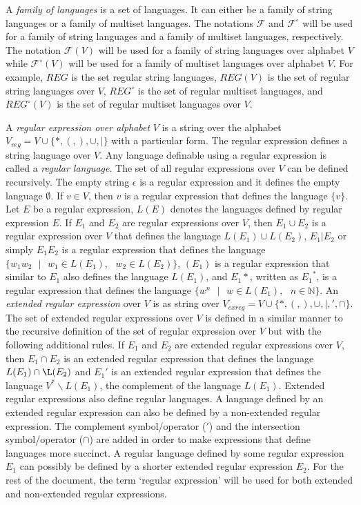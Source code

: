 \documentclass[a4paper]{article}
\theoremstyle{definition}
\newcommand{\ts}{\text{ }}
\begin{document}
A \emph{family of languages} is a set of languages. It can either be a family of string languages or 
a family of multiset languages. The notations $\mathscr{F}$ and $\mathscr{F}^{\circ}$ will be used
for a family of string languages and a family of multiset languages, respectively. The notation
$\mathscr{F}(V)$ will be used for a family of string languages over alphabet $V$ while 
$\mathscr{F}^{\circ}(V)$ will be used for a family of multiset languages over alphabet $V$. For
example, $REG$ is the set regular string languages, $REG(V)$ is the set of regular string 
languages over $V$, $REG^{\circ}$ is the set of regular multiset languages, and $REG^{\circ}(V)$ 
is the set of regular multiset languages over $V$.

A \emph{regular expression over alphabet} $V$ is a string over the alphabet $V_{reg} = V \cup 
\{*,(,),\cup,|\}$ with a particular form. The regular expression defines a string language over $V$.
Any language definable using a regular expression is called a \emph{regular language}. The set of 
all regular expressions over $V$ can be defined recursively. The empty string $\epsilon$ is a 
regular expression and it defines the empty language $\emptyset$. If $v \in V$, then $v$ is a
regular expression that defines the language $\{v\}$. Let $E$ be a regular expression, $L(E)$ 
denotes the languages defined by regular expression $E$. If $E_1$ and $E_2$ are regular expressions
over $V$, then $E_1 \cup E_2$ is a regular expression over $V$ that defines the language
$L(E_1) \cup L(E_2)$, $E_1 | E_2$ or simply $E_1 E_2$ is a regular expression that defines the
language $\{w_1 w_2\ts|\ts w_1\in L(E_1),\ts w_2\in L(E_2)\}$, $(E_1)$ is a regular expression that
similar to $E_1$ also defines the language $L(E_1)$, and ${E_1}*$, written as ${E_1}^*$, is a 
regular expression that defines the language $\{w^n\ts |\ts w\in L(E_1),\ts n\in \mathbb{N}\}$. An 
\emph{extended regular expression} over $V$ is as string over $V_{exreg} = V \cup \{*,(,),\cup,|,',
\cap\}$. The set of extended regular expressions over $V$ is defined in a similar manner to the
recursive definition of the set of regular expression over $V$ but with the following additional
rules. If $E_1$ and $E_2$ are extended regular expressions over $V$, then $E_1 \cap E_2$ is an
extended regular expression that defines the language $L(E_1) \cap \L(E_2)$ and $E_1'$ is an
extended regular expression that defines the language $V^*\backslash L(E_1)$, the complement of the
language $L(E_1)$. Extended regular expressions also define regular languages. A language defined by
an extended regular expression can also be defined by a non-extended regular expression.  The 
complement symbol/operator ($'$) and the intersection symbol/operator ($\cap$) are added in order to 
make expressions that define languages more succinct. A regular language defined by some regular
expression $E_1$ can possibly be defined by a shorter extended regular expression $E_2$. For the
rest of the document, the term `regular expression' will be used for both extended and non-extended
regular expressions.
\end{document}

